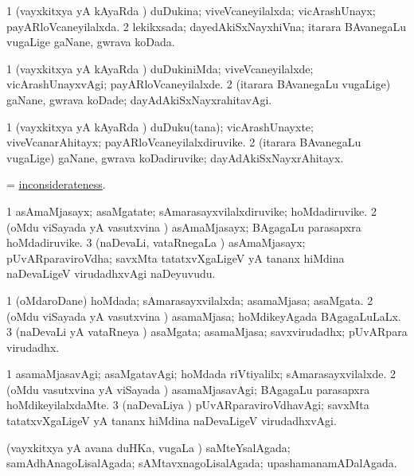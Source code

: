 \bentry
{}
\gl{\gu}
\bmng
\bnum
\num{1} (vayxkitxya yA kAyaRda \vi) duDukina; viveVcaneyilalxda; vicArashUnayx; payARloVcaneyilalxda. 
\num{2} lekikxsada; dayedAkiSxNayxhiVna; itarara BAvanegaLu \mo vugaLige gaNane, gwrava koDada. 
\enum
\emng
\eentry

\bentry
{}
\gl{\kirxvi}
\bmng
\bnum
\num{1} (vayxkitxya yA kAyaRda \vi) duDukiniMda; viveVcaneyilalxde; vicArashUnayxvAgi; payARloVcaneyilalxde. 
\num{2} (itarara BAvanegaLu \mo vugaLige) gaNane, gwrava koDade; dayAdAkiSxNayxrahitavAgi. 
\enum
\emng
\eentry

\bentry
{}
\gl{\nA}
\bmng
\bnum
\num{1} (vayxkitxya yA kAyaRda \vi) duDuku(tana); vicArashUnayxte; viveVcanarAhitayx; payARloVcaneyilalxdiruvike. 
\num{2} (itarara BAvanegaLu \mo vugaLige) gaNane, gwrava koDadiruvike; dayAdAkiSxNayxrAhitayx. 
\enum
\emng
\eentry

\bentry
{}
\gl{\nA}
\bmng
 = \hyperlink{inconsiderateness}{inconsiderateness}. 
\emng
\eentry

\bentry
{}
\gl{\nA}
\bmng
\bnum
\num{1} asAmaMjasayx; asaMgatate; sAmarasayxvilalxdiruvike; hoMdadiruvike. 
\num{2} (oMdu viSayada yA vasutxvina \vi) asAmaMjasayx; BAgagaLu parasapxra hoMdadiruvike. 
\num{3} (naDevaLi, vataRnegaLa \vi) asAmaMjasayx; pUvARparaviroVdha; savxMta tatatxvXgaLigeV yA tananx hiMdina naDevaLigeV virudadhxvAgi naDeyuvudu. 
\enum
\emng
\eentry

\bentry
{}
\gl{\gu}
\bmng
\bnum
\num{1} (oMdaroDane) hoMdada; sAmarasayxvilalxda; asamaMjasa; asaMgata. 
\num{2} (oMdu viSayada yA vasutxvina \vi) asamaMjasa; hoMdikeyAgada BAgagaLuLaLx. 
\num{3} (naDevaLi yA vataRneya \vi) asaMgata; asamaMjasa; savxvirudadhx; pUvARpara virudadhx. 
\enum
\emng
\eentry

\bentry
{}
\gl{\kirxvi}
\bmng
\bnum
\num{1} asamaMjasavAgi; asaMgatavAgi; hoMdada riVtiyalilx; sAmarasayxvilalxde. 
\num{2} (oMdu vasutxvina yA viSayada \vi) asamaMjasavAgi; BAgagaLu parasapxra hoMdikeyilalxdaMte. 
\num{3} (naDevaLiya \vi) pUvARparaviroVdhavAgi; savxMta tatatxvXgaLigeV yA tananx hiMdina naDevaLigeV virudadhxvAgi. 
\enum
\emng
\eentry

\bentry
{}
\gl{\gu}
\bmng
(vayxkitxya yA avana duHKa, \mo vugaLa \vi) saMteYsalAgada; samAdhAnagoLisalAgada; sAMtavxnagoLisalAgada; upashamanamADalAgada. 
\emng
\eentry

